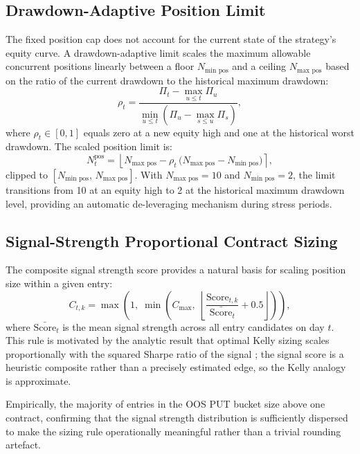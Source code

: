 \documentclass[10pt,twocolumn]{article}
\begin{document}
\subsection{Drawdown-Adaptive Position Limit}

The fixed position cap does not account for the current state of the
strategy's equity curve. A drawdown-adaptive limit scales the maximum
allowable concurrent positions linearly between a floor $N_{\text{min pos}}$
and a ceiling $N_{\text{max pos}}$ based on the ratio of the current drawdown
to the historical maximum drawdown:
%
\begin{equation}
\rho_t = \frac{\Pi_t - \max_{u \leq t}\Pi_u}
              {\min_{u \leq t}\!\left(\Pi_u - \max_{s \leq u}\Pi_s\right)},
\end{equation}
%
where $\rho_t \in [0,1]$ equals zero at a new equity high and one at the
historical worst drawdown. The scaled position limit is:
%
\begin{equation}
N_t^{\text{pos}} = \left\lfloor
  N_{\text{max pos}} - \rho_t\,\bigl(N_{\text{max pos}} - N_{\text{min pos}}\bigr)
\right\rceil,
\end{equation}
%
clipped to $[N_{\text{min pos}},\, N_{\text{max pos}}]$. With
$N_{\text{max pos}} = 10$ and $N_{\text{min pos}} = 2$, the limit transitions
from 10 at an equity high to 2 at the historical maximum drawdown level,
providing an automatic de-leveraging mechanism during stress periods.

\subsection{Signal-Strength Proportional Contract Sizing}

The composite signal strength score provides a natural basis for scaling
position size within a given entry:
%
\begin{equation}
C_{t,k} = \max\!\left(1,\;
  \min\!\left(C_{\text{max}},\;
  \left\lfloor
    \frac{\text{Score}_{t,k}}{\bar{\text{Score}}_t} + 0.5
  \right\rfloor
  \right)\right),
\end{equation}
%
where $\bar{\text{Score}}_t$ is the mean signal strength across all entry
candidates on day $t$. This rule is motivated by the analytic result that optimal Kelly sizing
scales proportionally with the squared Sharpe ratio of the signal
\cite{kelly1956}; the signal score is a heuristic composite rather than a
precisely estimated edge, so the Kelly analogy is approximate.

Empirically, the majority of entries in the OOS PUT bucket size above one
contract, confirming that the signal strength distribution is sufficiently
dispersed to make the sizing rule operationally meaningful rather than a
trivial rounding artefact.
\end{document}
